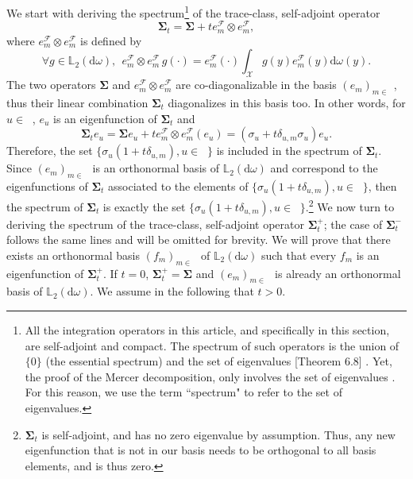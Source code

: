 \documentclass[twoside,11pt]{book}
\numberwithin{theorem}{chapter}
\numberwithin{definition}{chapter}
\numberwithin{proposition}{chapter}
\numberwithin{corollary}{chapter}
\numberwithin{example}{chapter}
\numberwithin{lemma}{chapter}
\numberwithin{assumption}{chapter}
\numberwithin{equation}{chapter}
\numberwithin{figure}{chapter}
\DeclareMathOperator{\F}{\mathcal{F}}
\DeclareMathOperator{\X}{\mathcal{X}}
\def\Ltwo{\mathbb{L}_{2}(\mathrm{d} \omega)}
\DeclareMathOperator{\Ns}{\mathbb{N}^{*}}
\newcommand{\ab}[1]{\textcolor{red}{#1}}
\begin{document}
We start with deriving the spectrum\footnote{
All the integration operators in this article, and specifically in this section, are self-adjoint and compact. The spectrum of such operators is the union of $\{0\}$ (the essential spectrum) and the set of eigenvalues \parencite{Bre10}[Theorem 6.8] . Yet, the proof of the Mercer decomposition, only involves the set of eigenvalues \parencite{StSc12}. For this reason, we use the term ``spectrum" to refer to the set of eigenvalues.} of the trace-class, self-adjoint operator
\begin{equation}
\bm{\Sigma}_{t} = \bm{\Sigma} + t e_{m}^{\F} \otimes e_{m}^{\F},
\end{equation}
where $e_{m}^{\F} \otimes e_{m}^{\F}$ is defined by
\begin{equation}
\forall g \in \Ltwo, \:\: e_{m}^{\F} \otimes e_{m}^{\F} \,g(\cdot) = e_{m}^{\F}(\cdot) \int_{\X}g(y)e_{m}^{\F}(y) \mathrm{d}\omega(y).
\end{equation}
The two operators $\bm{\Sigma}$ and $e_{m}^{\F} \otimes e_{m}^{\F}$ are co-diagonalizable in the basis $(e_{m})_{m \in \Ns}$, thus their linear combination $\bm{\Sigma}_{t}$ diagonalizes in this basis too. In other words, for $u \in \Ns$, $e_{u}$ is an eigenfunction of $\bm{\Sigma}_{t}$ and
\begin{equation}
\bm{\Sigma}_{t} e_{u} = \bm{\Sigma} e_{u} + t e_{m}^{\F} \otimes e_{m}^{\F} (e_{u}) = (\sigma_{u} + t \delta_{u,m} \sigma_{u}) e_{u}.
\end{equation}
Therefore, the set $\{\sigma_{u}(1+t\delta_{u,m}), u \in \Ns\}$ is included in the spectrum of $\bm{\Sigma}_t$. Since $(e_{m})_{m \in \Ns}$ is an orthonormal basis of $\Ltwo$ and correspond to the eigenfunctions of $\bm{\Sigma}_{t}$ associated to the elements of $\{\sigma_{u}(1+t\delta_{u,m}), u \in \Ns\}$, then the spectrum of $\bm{\Sigma}_t$ is exactly the set $\{\sigma_{u}(1+t\delta_{u,m}), u \in \Ns\}$.\footnote{$\bm{\Sigma}_{t}$ is self-adjoint, and has no zero eigenvalue by assumption. Thus, any new eigenfunction that is not in our basis needs to be orthogonal to all basis elements, and is thus zero.}
We now turn to deriving the spectrum of the trace-class, self-adjoint operator $\bm{\Sigma}_{t}^{+}$; the case of $\bm{\Sigma}_{t}^{-}$ follows the same lines and will be omitted for brevity.
We will prove that there exists an orthonormal basis $(f_{m})_{m \in \Ns}$ of $\Ltwo$ such that every $f_m$ is an eigenfunction of $\bm{\Sigma}_{t}^{+}$. If $t=0$, $\bm{\Sigma}_{t}^{+} = \bm{\Sigma}$ and $(e_{m})_{m \in \Ns}$ is already an orthonormal basis of $\Ltwo$. We assume in the following that $t>0$.
\end{document}

